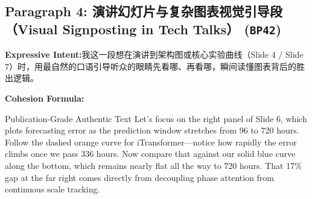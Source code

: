 \subsection*{Paragraph 4: 演讲幻灯片与复杂图表视觉引导段（Visual Signposting in Tech Talks） (\texttt{BP42})}
\noindent\textbf{Expressive Intent:}\enspace 我这一段想在演讲到架构图或核心实验曲线（Slide 4 / Slide 7）时，用最自然的口语引导听众的眼睛先看哪、再看哪，瞬间读懂图表背后的胜出逻辑。\par
\noindent\textbf{Cohesion Formula:}\par\vspace{4pt}
\begin{ExampleBox}{Publication-Grade Authentic Text}
Let's focus on the right panel of Slide 6, which plots forecasting error as the prediction window stretches from 96 to 720 hours. Follow the dashed orange curve for iTransformer---notice how rapidly the error climbs once we pass 336 hours. Now compare that against our solid blue curve along the bottom, which remains nearly flat all the way to 720 hours. That 17\% gap at the far right comes directly from decoupling phase attention from continuous scale tracking.
\end{ExampleBox}
